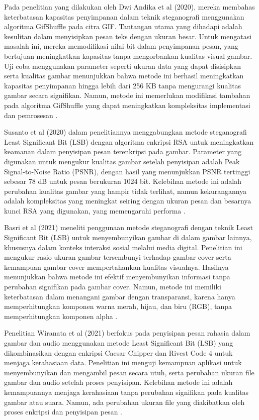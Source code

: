 \documentclass{ittelkom}
\begin{document}
{    Pada penelitian yang dilakukan oleh Dwi Andika et al (2020), mereka membahas
    keterbatasan kapasitas penyimpanan dalam teknik steganografi menggunakan
    algoritma GifShuffle pada citra GIF. Tantangan utama yang dihadapi adalah
    kesulitan dalam menyisipkan pesan teks dengan ukuran besar. Untuk mengatasi
    masalah ini, mereka memodifikasi nilai bit dalam penyimpanan pesan, yang
    bertujuan meningkatkan kapasitas tanpa mengorbankan kualitas visual gambar. Uji
    coba menggunakan parameter seperti ukuran data yang dapat disisipkan serta
    kualitas gambar menunjukkan bahwa metode ini berhasil meningkatkan kapasitas
    penyimpanan hingga lebih dari 256 KB tanpa mengurangi kualitas gambar secara
    signifikan. Namun, metode ini memerlukan modifikasi tambahan pada algoritma
    GifShuffle yang dapat meningkatkan kompleksitas implementasi dan pemrosesan
    \cite{andika2020modifikasi}.

    Susanto et al (2020) dalam penelitiannya menggabungkan metode steganografi
    Least Significant Bit (LSB) dengan algoritma enkripsi RSA untuk meningkatkan
    keamanan dalam penyisipan pesan terenkripsi pada gambar. Parameter yang
    digunakan untuk mengukur kualitas gambar setelah penyisipan adalah Peak
    Signal-to-Noise Ratio (PSNR), dengan hasil yang menunjukkan PSNR tertinggi
    sebesar 78 dB untuk pesan berukuran 1024 bit. Kelebihan metode ini adalah
    perubahan kualitas gambar yang hampir tidak terlihat, namun kekurangannya
    adalah kompleksitas yang meningkat seiring dengan ukuran pesan dan besarnya
    kunci RSA yang digunakan, yang memengaruhi performa
    \cite{susanto2020kombinasi}.

    Basri et al (2021) meneliti penggunaan metode steganografi dengan teknik Least
    Significant Bit (LSB) untuk menyembunyikan gambar di dalam gambar lainnya,
    khususnya dalam konteks interaksi sosial melalui media digital. Penelitian ini
    mengukur rasio ukuran gambar tersembunyi terhadap gambar cover serta kemampuan
    gambar cover mempertahankan kualitas visualnya. Hasilnya menunjukkan bahwa
    metode ini efektif menyembunyikan informasi tanpa perubahan signifikan pada
    gambar cover. Namun, metode ini memiliki keterbatasan dalam menangani gambar
    dengan transparansi, karena hanya memperhitungkan komponen warna merah, hijau,
    dan biru (RGB), tanpa memperhitungkan komponen alpha \cite{basri2021penerapan}.

    Penelitian Wiranata et al (2021) berfokus pada penyisipan pesan rahasia dalam
    gambar dan audio menggunakan metode Least Significant Bit (LSB) yang
    dikombinasikan dengan enkripsi Caesar Chipper dan Rivest Code 4 untuk menjaga
    kerahasiaan data. Penelitian ini menguji kemampuan aplikasi untuk
    menyembunyikan dan mengambil pesan secara utuh, serta perubahan ukuran file
    gambar dan audio setelah proses penyisipan. Kelebihan metode ini adalah
    kemampuannya menjaga kerahasiaan tanpa perubahan signifikan pada kualitas
    gambar atau suara. Namun, ada perubahan ukuran file yang diakibatkan oleh
    proses enkripsi dan penyisipan pesan \cite{wiranata2021aplikasi}.

}
\end{document}
